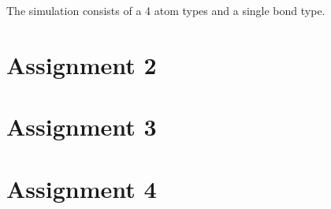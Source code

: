 \documentclass[10pt,a4paper,onecollum]{labreport}
\begin{document}
\begin{@twocolumnfalse}
\begin{enumerate}
\begin{itemize}
  \end{itemize}
  
  The simulation consists of a 4 atom types and a single bond type. 
\end{enumerate}

\section*{Assignment 2}

\section*{Assignment 3}

\section*{Assignment 4}

\end{@twocolumnfalse}


\newpage

%   
\end{document}
